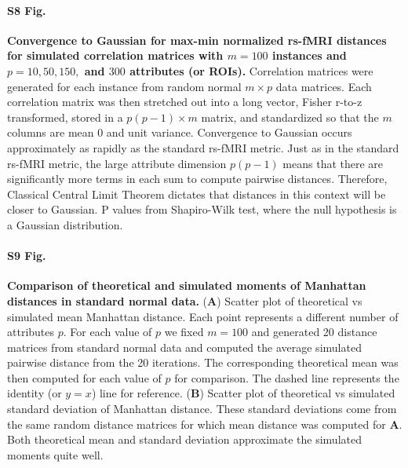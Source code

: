 \documentclass[10pt,letterpaper]{article}
\begin{document}
\paragraph*{S8 Fig.}
\hypertarget{S8_Fig}{
{\bf Convergence to Gaussian for max-min normalized rs-fMRI distances for simulated correlation matrices with $m=100$ instances and $p=10, 50, 150,$ and $300$ attributes (or ROIs).} Correlation matrices were generated for each instance from random normal $m \times p$ data matrices. Each correlation matrix was then stretched out into a long vector, Fisher r-to-z transformed, stored in a $p(p-1) \times m$ matrix, and standardized so that the $m$ columns are mean 0 and unit variance. Convergence to Gaussian occurs approximately as rapidly as the standard rs-fMRI metric. Just as in the standard rs-fMRI metric, the large attribute dimension $p(p-1)$ means that there are significantly more terms in each sum to compute pairwise distances. Therefore, Classical Central Limit Theorem dictates that distances in this context will be closer to Gaussian. P values from Shapiro-Wilk test, where the null hypothesis is a Gaussian distribution.}

\paragraph*{S9 Fig.}
\hypertarget{S9_Fig}{
{\bf Comparison of theoretical and simulated moments of Manhattan distances in standard normal data.} (\textbf{A}) Scatter plot of theoretical vs simulated mean Manhattan distance. Each point represents a different number of attributes $p$. For each value of $p$ we fixed $m=100$ and generated 20 distance matrices from standard normal data and computed the average simulated pairwise distance from the 20 iterations. The corresponding theoretical mean was then computed for each value of $p$ for comparison. The dashed line represents the identity (or $y=x$) line for reference. (\textbf{B}) Scatter plot of theoretical vs simulated standard deviation of Manhattan distance. These standard deviations come from the same random distance matrices for which mean distance was computed for \textbf{A}. Both theoretical mean and standard deviation approximate the simulated moments quite well.}
\end{document}
